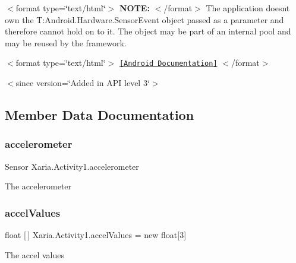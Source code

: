 $<$format type=\char`\"{}text/html\char`\"{}$>$ {\bfseries N\+O\+TE\+:} $<$/format$>$ The application doesn\textquotesingle{}t own the {\ttfamily T\+:\+Android.\+Hardware.\+Sensor\+Event} object passed as a parameter and therefore cannot hold on to it. The object may be part of an internal pool and may be reused by the framework.

$<$format type=\char`\"{}text/html\char`\"{}$>$ \href{http://developer.android.com/reference/android/hardware/SensorEventListener.html#onSensorChanged(android.hardware.SensorEvent)}{\tt \mbox{[}Android Documentation\mbox{]}} $<$/format$>$ 

$<$since version=\char`\"{}\+Added in A\+P\+I level 3\char`\"{}$>$ 

\subsection{Member Data Documentation}
\mbox{\label{classXaria_1_1Activity1_a60c77f521c1a61fe00fad362d9cae9ea}} 
\subsubsection{\texorpdfstring{accelerometer}{accelerometer}}
{\footnotesize\ttfamily Sensor Xaria.\+Activity1.\+accelerometer\hspace{0.3cm}{\ttfamily [private]}}



The accelerometer 

\mbox{\label{classXaria_1_1Activity1_a27724ecd7f40103c5f2e1175d4138283}} 
\subsubsection{\texorpdfstring{accel\+Values}{accelValues}}
{\footnotesize\ttfamily float \mbox{[}$\,$\mbox{]} Xaria.\+Activity1.\+accel\+Values = new float\mbox{[}3\mbox{]}\hspace{0.3cm}{\ttfamily [static]}}



The accel values 

